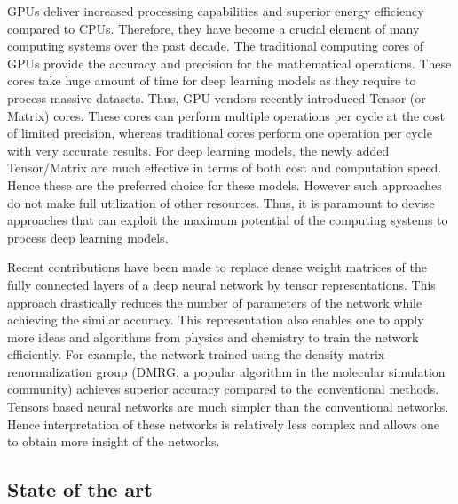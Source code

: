 GPUs deliver increased processing capabilities and superior energy efficiency compared to CPUs. Therefore, they have become a crucial element of many computing systems over the past decade. The traditional computing cores of GPUs provide the accuracy and precision for the mathematical operations. These cores take huge amount of time for deep learning models as they require to process massive datasets. Thus, GPU vendors recently introduced Tensor (or Matrix) cores. These cores can perform multiple operations per cycle at the cost of limited precision, whereas traditional cores perform one operation per cycle with very accurate results. For deep learning models, the newly added Tensor/Matrix are much effective in terms of both cost and computation speed. Hence these are the preferred choice for these models. However such approaches do not make full utilization of other resources. Thus, it is paramount to devise approaches that can exploit the maximum potential of the computing systems to process deep learning models.


Recent contributions have been made to replace dense weight matrices of the fully connected layers of a deep neural network by tensor representations. This approach drastically reduces the number of parameters of the network while achieving the similar accuracy. This representation also enables one to apply more ideas and algorithms from physics and chemistry to train the network efficiently. For example, the network trained using the density matrix renormalization group (DMRG, a popular algorithm in the molecular simulation community) achieves superior accuracy compared to the conventional methods. Tensors based neural networks are much simpler than the conventional networks. Hence interpretation of these networks is relatively less complex and allows one to obtain more insight of the networks.


\subsection*{State of the art}





